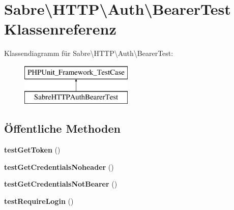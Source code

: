\hypertarget{class_sabre_1_1_h_t_t_p_1_1_auth_1_1_bearer_test}{}\section{Sabre\textbackslash{}H\+T\+TP\textbackslash{}Auth\textbackslash{}Bearer\+Test Klassenreferenz}
\label{class_sabre_1_1_h_t_t_p_1_1_auth_1_1_bearer_test}
Klassendiagramm für Sabre\textbackslash{}H\+T\+TP\textbackslash{}Auth\textbackslash{}Bearer\+Test\+:\begin{figure}[H]
\begin{center}
\leavevmode
\includegraphics[height=2.000000cm]{class_sabre_1_1_h_t_t_p_1_1_auth_1_1_bearer_test}
\end{center}
\end{figure}
\subsection*{Öffentliche Methoden}
\begin{DoxyCompactItemize}
\item 
\mbox{\label{class_sabre_1_1_h_t_t_p_1_1_auth_1_1_bearer_test_a402aff22f281ed912ed6f92d7da15b23}} 
{\bfseries test\+Get\+Token} ()
\item 
\mbox{\label{class_sabre_1_1_h_t_t_p_1_1_auth_1_1_bearer_test_ae3b396934368205a272b8adcf0a8f7b4}} 
{\bfseries test\+Get\+Credentials\+Noheader} ()
\item 
\mbox{\label{class_sabre_1_1_h_t_t_p_1_1_auth_1_1_bearer_test_a8ddabc92a52481bb5a8b3c37543b0081}} 
{\bfseries test\+Get\+Credentials\+Not\+Bearer} ()
\item 
\mbox{\label{class_sabre_1_1_h_t_t_p_1_1_auth_1_1_bearer_test_a2f3030966d327141b3c065cb6517f7a6}} 
{\bfseries test\+Require\+Login} ()
\end{DoxyCompactItemize}



